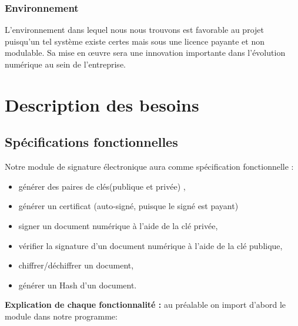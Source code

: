 \documentclass[12pt,a4paper]{article}
\begin{document}
	
		\subsubsection*{Environnement}
		
		 
		    L’environnement dans lequel nous nous trouvons est favorable au projet puisqu’un
tel système existe certes mais sous une licence payante  et non modulable. Sa mise en œuvre sera une innovation importante dans l’évolution numérique au sein de l'entreprise.
\newpage
\section{Description des besoins}

	\subsection{Spécifications fonctionnelles}
	
	Notre module de signature électronique aura comme spécification fonctionnelle :
	
	\begin{itemize}
		\item générer des paires de clés(publique et privée) ,
		\item générer un certificat (auto-signé, puisque le signé est payant)
		\item signer un document numérique à l'aide de la clé privée,
		\item vérifier la signature d'un document numérique à l'aide de la clé publique,
		\item chiffrer/déchiffrer un document,
		\item générer un Hash d'un document.\\
	\end{itemize}
	
	\textbf{Explication de chaque fonctionnalité : } au préalable on import d'abord le module dans notre programme:\\
	
\end{document}
